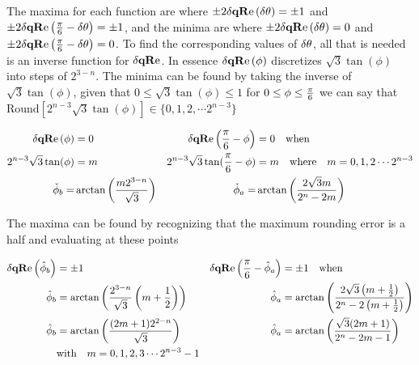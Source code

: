 The maxima for each function are where $\pm 2 \dqRe[ \thetaA ]  = \pm 1$ and $\pm 2 \dqRe[ \Pii{6} -\thetaA]= \pm 1$, and the minima are where $\pm 2 \dqRe[ \thetaA ]  = 0$ and $\pm 2 \dqRe[ \Pii{6} -\thetaA] = 0$. To find the corresponding values of $\delta\theta$, all that is needed is an inverse function for $\dqRe$. In essence $\dqRe[\phi]$ discretizes $\sqrt{3} \tan (\phi )$ into steps of $2^{3-n}$. The minima can be found by taking the inverse of $\sqrt{3} \tan (\phi )$, given that
$0\le\sqrt{3} \tan (\phi )\le1$ for $0 \le \phi \le \frac{\pi}{6}$ we can say that $\text{Round}\left[ 2^{n-3}\sqrt{3} \tan (\phi ) \right] \in \{ 0, 1, 2, \cdots 2^{n-3} \}$ 


\newcommand{\extremaTheta}[2]{\mathring{\phi} _{#1}\left( \scalebox{0.75}[1.0]{\( #2 \)}\right)}
\newcommand{\maximaTheta}[1]{\hat{\phi}_{#1}}
\newcommand{\minimaTheta}[1]{\check{\phi}_{#1}}
\newcommand{\thetaX}[1]{\overset{\times}{\phi}\left( \scalebox{0.75}[1.0]{\( #1 \)}\right)}

\begin{align*}
\dqRe[\phi] & = 0 & \dqRe[\Pii{6}-\phi] & = 0 \quad \text{when} \\
2^{n-3}\sqrt{3} \tan (\phi ) & = m & 
2^{n-3}\sqrt{3} \tan (\Pii{6}-\phi ) &= m \quad \text{where}\quad m=0,1,2 \cdots 2^{n-3} \\
 \minimaTheta{b} = & \arctan\left(\frac{m 2^{3-n}}{\sqrt{3}}  \right) &
 \minimaTheta{a} = & \arctan\left(\frac{2 \sqrt{3} m}{2^n - 2 m}\right) 
\end{align*}

The maxima can be found by recognizing that the maximum rounding error is a half and evaluating at these points

\begin{align*}
\dqRe[\maximaTheta{b} ] & = \pm 1 & \dqRe[\Pii{6}-\maximaTheta{a} ] & = \pm 1  \quad \text{when} \\
\maximaTheta{b} & =\arctan\left(\frac{ 2^{3-n} }{\sqrt{3}} \left(m+\frac{1}{2}\right) \right) &
\maximaTheta{a} & = \arctan\left(\frac{2 \sqrt{3} \left(m+\frac{1}{2}\right)}{2^n - 2 \left(m+\frac{1}{2}\right)}\right)  \\
 \maximaTheta{b}  &=  \arctan\left(\frac{(2 m+1) 2^{2-n}}{\sqrt{3}}          \right) &
  \maximaTheta{a}  &=  \arctan\left(\frac{\sqrt{3} (2 m+1)}{2^n-2 m-1}  \right) \\
  \quad&\text{with}\quad   m =  0,1,2,3 \cdots2^{n-3}-1 
\end{align*}

